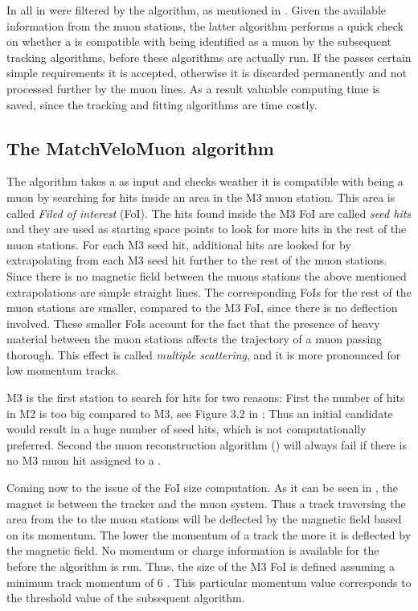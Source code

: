 In \runone all \veloTracks in \hltone were filtered by the \mvm algorithm, as mentioned in .
Given the available information from the muon stations, the latter algorithm performs a quick check on whether a \veloTrack is compatible
with being identified as a muon by the subsequent tracking algorithms, before these algorithms are actually run.
If the \veloTrack passes certain simple requirements it
is accepted, otherwise it is discarded permanently and not processed further by the \hlt muon lines. As a result
valuable computing time is saved, since the \FwD tracking and fitting algorithms are time costly.

\subsection{The MatchVeloMuon algorithm}
\label{sec:muon_matching}

The \mvm algorithm takes a \veloTrack as input and checks weather it is compatible with being a muon by
searching for hits inside an area in the M3 muon station. This area is called {\it Filed of interest} (FoI).
The hits found inside the M3 FoI are called {\it seed hits} and they are used as starting space points to look
for more hits in the rest of the muon stations. For each M3 seed hit, additional hits are looked for
by extrapolating from each M3 seed hit further to the rest of the muon stations.
Since there is no magnetic field between the muons stations the above mentioned extrapolations are simple straight lines.
The corresponding FoIs for the rest of the muon stations are smaller, compared to the M3 FoI, since there
is no deflection involved. These smaller FoIs account for the fact that the presence of heavy material
between the muon stations affects the trajectory of a muon passing thorough. This effect is called {\it multiple
scattering}, and it is more pronounced for low momentum tracks.

M3 is the first station to search for hits for two reasons: First the number of hits in M2 is too big compared
to M3, see Figure 3.2 in \cite{roelThesis}; Thus an initial \veloTrack candidate would result in a huge number
of seed hits, which is not computationally preferred. Second the muon reconstruction algorithm (\isMuon) will
always fail if there is no M3 muon hit assigned to a \veloTrack.

Coming now to the issue of the FoI size computation. As it can be seen in ,
the \lhcb magnet is between the \velo tracker and the muon system. Thus a track traversing the area from the
\velo to the muon stations will be deflected by the magnetic field based on its momentum.  The lower the momentum
of a track the more it is deflected by the magnetic field. No momentum or charge information is available for
the \veloTrack before the \FwD algorithm is run. Thus, the size of the M3 FoI is defined assuming a minimum
track momentum of 6 \gevc. This particular momentum value corresponds to the threshold value of the subsequent
\isMuon algorithm.


